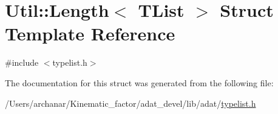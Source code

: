 \hypertarget{structUtil_1_1TL_1_1Length}{}\section{Util\+:\+:Length$<$ T\+List $>$ Struct Template Reference}
\label{structUtil_1_1TL_1_1Length}


{\ttfamily \#include $<$typelist.\+h$>$}



The documentation for this struct was generated from the following file\+:\begin{DoxyCompactItemize}
\item 
/\+Users/archanar/\+Kinematic\+\_\+factor/adat\+\_\+devel/lib/adat/\mbox{\hyperlink{lib_2adat_2typelist_8h}{typelist.\+h}}\end{DoxyCompactItemize}
